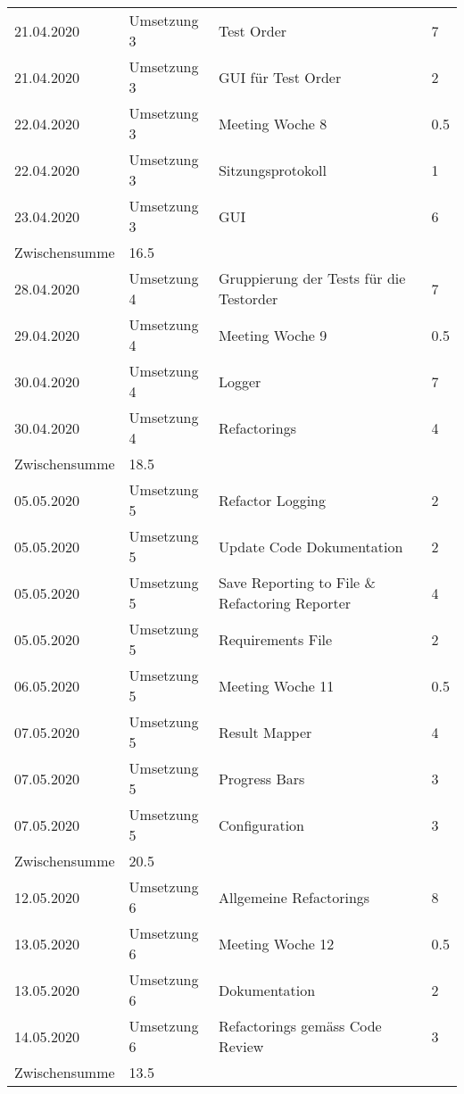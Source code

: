 \documentclass[
	ngerman,
	toc=listof, %
	toc=bibliography, %
	footnotes=multiple, %
	parskip=half, %
	numbers=noendperiod %
]{scrartcl}
\begin{document}
	\begin{tabularx}{\textwidth}{llXl}
		\toprule
		21.04.2020 & Umsetzung 3 & Test Order & 7 \\
		21.04.2020 & Umsetzung 3 & GUI für Test Order & 2 \\
		22.04.2020 & Umsetzung 3 & Meeting Woche 8 & 0.5 \\
		22.04.2020 & Umsetzung 3 & Sitzungsprotokoll & 1 \\
		23.04.2020 & Umsetzung 3 & GUI & 6 \\
		\midrule
		Zwischensumme & 16.5 & & \\
		\midrule 
		28.04.2020 & Umsetzung 4 & Gruppierung der Tests für die Testorder & 7 \\
		29.04.2020 & Umsetzung 4 & Meeting Woche 9 & 0.5 \\
		30.04.2020 & Umsetzung 4 & Logger & 7 \\
		30.04.2020 & Umsetzung 4 & Refactorings & 4 \\
		\midrule
		Zwischensumme & 18.5 & & \\
		\midrule
		05.05.2020 & Umsetzung 5 & Refactor Logging & 2 \\
		05.05.2020 & Umsetzung 5 & Update Code Dokumentation & 2 \\
		05.05.2020 & Umsetzung 5 & Save Reporting to File \& Refactoring Reporter & 4 \\ 
		05.05.2020 & Umsetzung 5 & Requirements File & 2 \\
		06.05.2020 & Umsetzung 5 & Meeting Woche 11 & 0.5 \\
		07.05.2020 & Umsetzung 5 & Result Mapper & 4 \\
		07.05.2020 & Umsetzung 5 & Progress Bars & 3 \\
		07.05.2020 & Umsetzung 5 & Configuration & 3 \\
		\midrule
		Zwischensumme & 20.5 & & \\
		\midrule
		12.05.2020 & Umsetzung 6 & Allgemeine Refactorings & 8 \\
		13.05.2020 & Umsetzung 6 & Meeting Woche 12 & 0.5 \\
		13.05.2020 & Umsetzung 6 & Dokumentation & 2 \\
		14.05.2020 & Umsetzung 6 & Refactorings gemäss Code Review & 3 \\
		\midrule
		Zwischensumme & 13.5 & & \\
		\bottomrule
	\end{tabularx}
\end{document}
